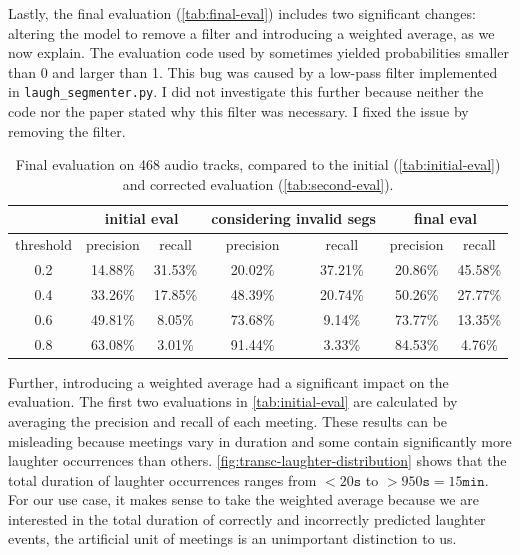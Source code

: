 \documentclass[bsc,frontabs,parskip,deptreport]{infthesis}
\begin{document}
Lastly, the final evaluation (\autoref{tab:final-eval}) includes two significant changes: altering the model to remove a filter and introducing a weighted average, as we now explain. 
The evaluation code used by \citet{gillick2021robust} sometimes yielded probabilities smaller than 0 and larger than 1. 
This bug was caused by a low-pass filter implemented in \verb|laugh_segmenter.py|. I did not investigate this further because neither the code nor the paper stated why this filter was necessary. I fixed the issue by removing the filter.

\begin{table}[h!]
    \centering
    \begin{tabular}{|c|c|c|c|c|c|c|}
    \hline
    & \multicolumn{2}{|c|}{initial eval} & \multicolumn{2}{|c|}{considering invalid segs} & \multicolumn{2}{|c|}{final eval}  \\
    \hline 
    threshold & precision & recall & precision & recall & precision & recall  \\
    \hline
        0.2 &  14.88\% & 31.53\% & 20.02\% & 37.21\%  & 20.86\% & 45.58\%\\
        0.4 &  33.26\% & 17.85\% & 48.39\% & 20.74\%  & 50.26\% & 27.77\%\\
        0.6 &  49.81\% & 8.05\% & 73.68\% & 9.14\%    & 73.77\% & 13.35\% \\
        0.8 &  63.08\% & 3.01\% & 91.44\% & 3.33\%    & 84.53\% & 4.76\% \\
     \hline
    \end{tabular}
    \caption{Final evaluation on 468 audio tracks, compared to the initial (\autoref{tab:initial-eval}) and corrected evaluation (\autoref{tab:second-eval}).}
    \label{tab:final-eval}
\end{table}

Further, introducing a weighted average had a significant impact on the evaluation. The first two evaluations in \autoref{tab:initial-eval} are calculated by averaging the precision and recall of each meeting.
These results can be misleading because meetings vary in duration and some contain significantly more laughter occurrences than others.
\autoref{fig:transc-laughter-distribution} shows that the total duration of laughter occurrences ranges from $<20\mathtt{s}$ to $>950\mathtt{s}=15\mathtt{min}$.
For our use case, it makes sense to take the weighted average because we are interested in the total duration of correctly and incorrectly predicted laughter events, the artificial unit of meetings is an unimportant distinction to us.
\end{document}
